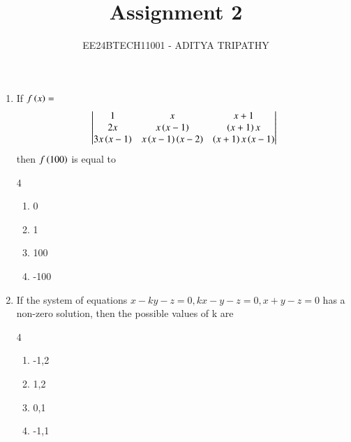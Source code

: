 \documentclass[journal,12pt,twocolumn]{IEEEtran}
\theoremstyle{remark}
\begin{document}

\vspace{3cm}

\title{Assignment 2}
\author{EE24BTECH11001 -  ADITYA TRIPATHY}
\maketitle
\newpage
\bigskip

\renewcommand{\thefigure}{\theenumi}
\renewcommand{\thetable}{\theenumi}

\begin{enumerate}
	\item[6.] If $ f\left(x\right) = $
		\begin{align*}
		\begin{vmatrix}
		1 & x & x+1 \\
		2x & x\left(x-1\right) & \left(x+1\right)x \\
		3x\left(x-1\right) & x\left(x-1\right)\left(x-2\right) & \left(x+1\right)x\left(x-1\right)
		\end{vmatrix} \end{align*} then $f\left(100\right)$ is equal to 
			\hfill{}
	\begin{multicols}{4}
		\begin{enumerate}[label = (\alph*)]
			\item 0 
			\columnbreak
			\item 1
			\columnbreak
			\item 100
			\columnbreak
			\item -100
		\end{enumerate}
	\end{multicols}

	\item[7.] If the system of equations $x-ky-z=0, kx-y-z=0,x+y-z=0$ has a non-zero  solution,  then the possible values of k are 
		\hfill{}
	\begin{multicols}{4}
		\begin{enumerate}[label = (\alph*)]
			\item -1,2 \columnbreak
			\item 1,2 \columnbreak
			\item 0,1 \columnbreak
			\item -1,1
		\end{enumerate}
	\end{multicols}



\end{enumerate}
\end{document}
